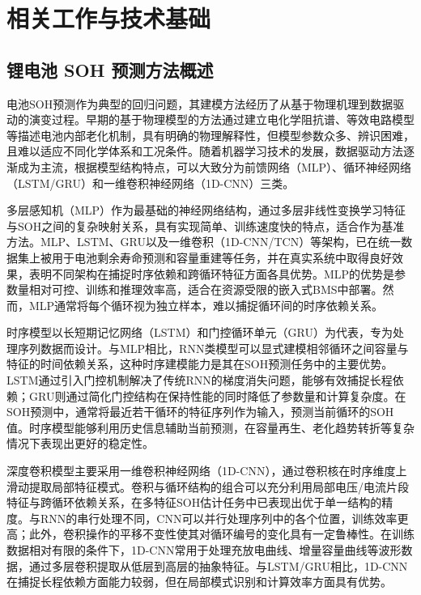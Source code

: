 \documentclass[10pt,a4paper]{ctexart}
\begin{document}
\section{相关工作与技术基础}\label{sec:related}

\subsection{锂电池 SOH 预测方法概述}

电池SOH预测作为典型的回归问题，其建模方法经历了从基于物理机理到数据驱动的演变过程\cite{liu2025deep}。早期的基于物理模型的方法通过建立电化学阻抗谱、等效电路模型等描述电池内部老化机制，具有明确的物理解释性，但模型参数众多、辨识困难，且难以适应不同化学体系和工况条件。随着机器学习技术的发展，数据驱动方法逐渐成为主流\cite{liu2025deep}，根据模型结构特点，可以大致分为前馈网络（MLP）、循环神经网络（LSTM/GRU）和一维卷积神经网络（1D-CNN）三类。

多层感知机（MLP）作为最基础的神经网络结构，通过多层非线性变换学习特征与SOH之间的复杂映射关系，具有实现简单、训练速度快的特点，适合作为基准方法\cite{bairwa2025cycle}。MLP、LSTM、GRU以及一维卷积（1D-CNN/TCN）等架构，已在统一数据集上被用于电池剩余寿命预测和容量重建等任务，并在真实系统中取得良好效果\cite{bairwa2025cycle}，表明不同架构在捕捉时序依赖和跨循环特征方面各具优势。MLP的优势是参数量相对可控、训练和推理效率高，适合在资源受限的嵌入式BMS中部署。然而，MLP通常将每个循环视为独立样本，难以捕捉循环间的时序依赖关系。

时序模型以长短期记忆网络（LSTM）和门控循环单元（GRU）为代表，专为处理序列数据而设计\cite{bairwa2025cycle}。与MLP相比，RNN类模型可以显式建模相邻循环之间容量与特征的时间依赖关系，这种时序建模能力是其在SOH预测任务中的主要优势。LSTM通过引入门控机制解决了传统RNN的梯度消失问题，能够有效捕捉长程依赖；GRU则通过简化门控结构在保持性能的同时降低了参数量和计算复杂度。在SOH预测中，通常将最近若干循环的特征序列作为输入，预测当前循环的SOH值。时序模型能够利用历史信息辅助当前预测，在容量再生、老化趋势转折等复杂情况下表现出更好的稳定性。

深度卷积模型主要采用一维卷积神经网络（1D-CNN），通过卷积核在时序维度上滑动提取局部特征模式\cite{zhang2024cnnsoh}。卷积与循环结构的组合可以充分利用局部电压/电流片段特征与跨循环依赖关系，在多特征SOH估计任务中已表现出优于单一结构的精度\cite{zhang2024cnnsoh}。与RNN的串行处理不同，CNN可以并行处理序列中的各个位置，训练效率更高；此外，卷积操作的平移不变性使其对循环编号的变化具有一定鲁棒性。在训练数据相对有限的条件下，1D-CNN常用于处理充放电曲线、增量容量曲线等波形数据，通过多层卷积提取从低层到高层的抽象特征。与LSTM/GRU相比，1D-CNN在捕捉长程依赖方面能力较弱，但在局部模式识别和计算效率方面具有优势。
\end{document}

